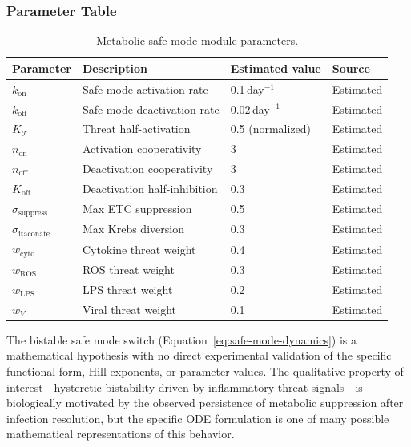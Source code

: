 \subsubsection{Parameter Table}

\begin{table}[htbp]
\centering
\caption{Metabolic safe mode module parameters.}
\label{tab:safe-mode-parameters}
\begin{tabular}{llll}
\hline
Parameter & Description & Estimated value & Source \\
\hline
$k_{\text{on}}$ & Safe mode activation rate & 0.1\,day$^{-1}$ & Estimated \\
$k_{\text{off}}$ & Safe mode deactivation rate & 0.02\,day$^{-1}$ & Estimated \\
$K_{\mathcal{T}}$ & Threat half-activation & 0.5 (normalized) & Estimated \\
$n_{\text{on}}$ & Activation cooperativity & 3 & Estimated \\
$n_{\text{off}}$ & Deactivation cooperativity & 3 & Estimated \\
$K_{\text{off}}$ & Deactivation half-inhibition & 0.3 & Estimated \\
$\sigma_{\text{suppress}}$ & Max ETC suppression & 0.5 & Estimated \\
$\sigma_{\text{itaconate}}$ & Max Krebs diversion & 0.3 & Estimated \\
$w_{\text{cyto}}$ & Cytokine threat weight & 0.4 & Estimated \\
$w_{\text{ROS}}$ & ROS threat weight & 0.3 & Estimated \\
$w_{\text{LPS}}$ & LPS threat weight & 0.2 & Estimated \\
$w_V$ & Viral threat weight & 0.1 & Estimated \\
\hline
\end{tabular}
\end{table}

\begin{limitation}
\label{lim:safe-mode-switch-formulation}
The bistable safe mode switch (Equation~\ref{eq:safe-mode-dynamics}) is a mathematical hypothesis with no direct experimental validation of the specific functional form, Hill exponents, or parameter values. The qualitative property of interest---hysteretic bistability driven by inflammatory threat signals---is biologically motivated by the observed persistence of metabolic suppression after infection resolution, but the specific ODE formulation is one of many possible mathematical representations of this behavior.
\end{limitation}

